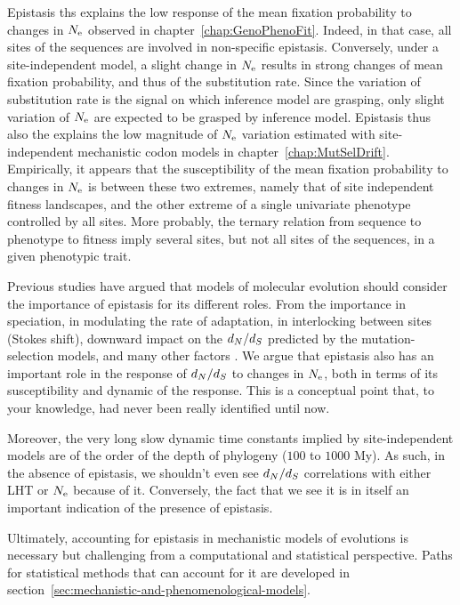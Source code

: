 Epistasis ths explains the low response of the mean fixation probability to changes in $N_{\textrm{e}}$ observed in chapter~\ref{chap:GenoPhenoFit}.
Indeed, in that case, all sites of the sequences are involved in non-specific epistasis.
Conversely, under a site-independent model, a slight change in $N_{\textrm{e}}$ results in strong changes of mean fixation probability, and thus of the substitution rate.
Since the variation of substitution rate is the signal on which inference model are grasping, only slight variation of $N_{\textrm{e}}$ are expected to be grasped by inference model.
Epistasis thus also the explains the low magnitude of $N_{\textrm{e}}$ variation estimated with site-independent mechanistic codon models in chapter~\ref{chap:MutSelDrift}.
Empirically, it appears that the susceptibility of the mean fixation probability to changes in $N_{\textrm{e}}$ is between these two extremes, namely that of site independent fitness landscapes, and the other extreme of a single univariate phenotype controlled by all sites.
More probably, the ternary relation from sequence to phenotype to fitness imply several sites, but not all sites of the sequences, in a given phenotypic trait.

Previous studies have argued that models of molecular evolution should consider the importance of epistasis for its different roles.
From the importance in speciation, in modulating the rate of adaptation, in interlocking between sites (Stokes shift), downward impact on the $d_N / d_S$ predicted by the mutation-selection models, and many other factors \citet{Goldstein2017, Miller2018}.
We argue that epistasis also has an important role in the response of $d_N / d_S$ to changes in $N_{\textrm{e}}$, both in terms of its susceptibility and dynamic of the response.
This is a conceptual point that, to your knowledge, had never been really identified until now.

Moreover, the very long slow dynamic time constants implied by site-independent models are of the order of the depth of phylogeny ($100$ to $1000$ My).
As such, in the absence of epistasis, we shouldn't even see $d_N / d_S$ correlations with either LHT or $N_{\textrm{e}}$ because of it.
Conversely, the fact that we see it is in itself an important indication of the presence of epistasis.

Ultimately, accounting for epistasis in mechanistic models of evolutions is necessary but challenging from a computational and statistical perspective.
Paths for statistical methods that can account for it are developed in section~\ref{sec:mechanistic-and-phenomenological-models}.


